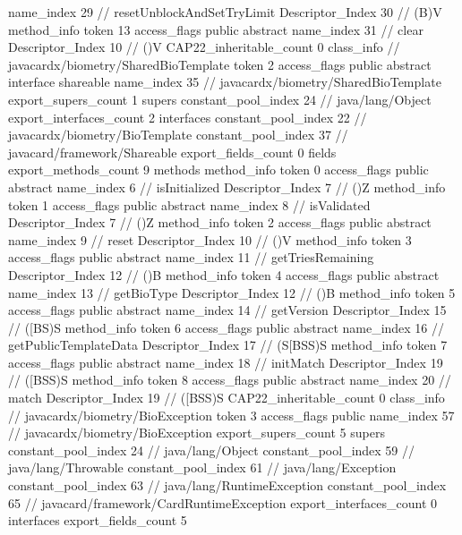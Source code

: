 {{{{{					name_index	29		// resetUnblockAndSetTryLimit
					Descriptor_Index	30		// (B)V
				}
				method_info {
					token	13
					access_flags	public abstract
					name_index	31		// clear
					Descriptor_Index	10		// ()V
				}
			}
			CAP22_inheritable_count	0
		}
		class_info {		// javacardx/biometry/SharedBioTemplate
			token	2
			access_flags	public abstract interface shareable
			name_index	35		// javacardx/biometry/SharedBioTemplate
			export_supers_count	1
			supers {
				constant_pool_index	24		// java/lang/Object
			}
			export_interfaces_count	2
			interfaces {
				constant_pool_index	22		// javacardx/biometry/BioTemplate
				constant_pool_index	37		// javacard/framework/Shareable
			}
			export_fields_count	0
			fields {
			}
			export_methods_count	9
			methods {
				method_info {
					token	0
					access_flags	public abstract
					name_index	6		// isInitialized
					Descriptor_Index	7		// ()Z
				}
				method_info {
					token	1
					access_flags	public abstract
					name_index	8		// isValidated
					Descriptor_Index	7		// ()Z
				}
				method_info {
					token	2
					access_flags	public abstract
					name_index	9		// reset
					Descriptor_Index	10		// ()V
				}
				method_info {
					token	3
					access_flags	public abstract
					name_index	11		// getTriesRemaining
					Descriptor_Index	12		// ()B
				}
				method_info {
					token	4
					access_flags	public abstract
					name_index	13		// getBioType
					Descriptor_Index	12		// ()B
				}
				method_info {
					token	5
					access_flags	public abstract
					name_index	14		// getVersion
					Descriptor_Index	15		// ([BS)S
				}
				method_info {
					token	6
					access_flags	public abstract
					name_index	16		// getPublicTemplateData
					Descriptor_Index	17		// (S[BSS)S
				}
				method_info {
					token	7
					access_flags	public abstract
					name_index	18		// initMatch
					Descriptor_Index	19		// ([BSS)S
				}
				method_info {
					token	8
					access_flags	public abstract
					name_index	20		// match
					Descriptor_Index	19		// ([BSS)S
				}
			}
			CAP22_inheritable_count	0
		}
		class_info {		// javacardx/biometry/BioException
			token	3
			access_flags	public
			name_index	57		// javacardx/biometry/BioException
			export_supers_count	5
			supers {
				constant_pool_index	24		// java/lang/Object
				constant_pool_index	59		// java/lang/Throwable
				constant_pool_index	61		// java/lang/Exception
				constant_pool_index	63		// java/lang/RuntimeException
				constant_pool_index	65		// javacard/framework/CardRuntimeException
			}
			export_interfaces_count	0
			interfaces {
			}
			export_fields_count	5
}}}
